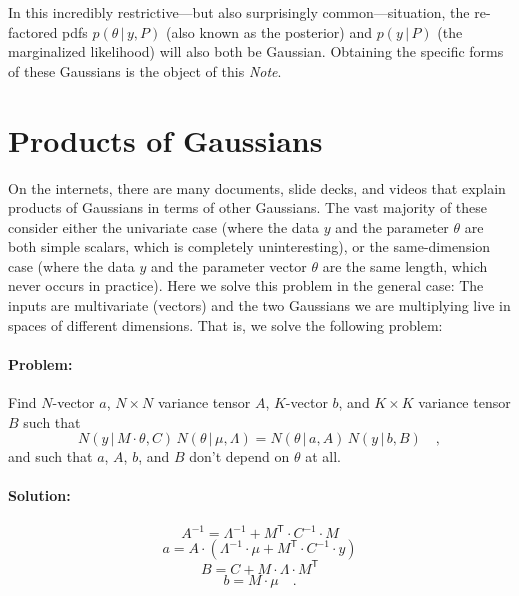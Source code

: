 \documentclass[12pt, letterpaper]{article}
\newcommand{\documentname}{\textsl{Note}}
\newcommand{\given}{\,|\,}
\newcommand{\T}{^{\!\mathsf{T}}}
\newcommand{\inv}{^{-1}}
\begin{document}
In this incredibly restrictive---but also surprisingly
common---situation, the re-factored pdfs $p(\theta\given y, P)$ (also
known as the posterior) and $p(y\given P)$ (the marginalized
likelihood) will also both be Gaussian.
Obtaining the specific forms of these Gaussians is the object of this
\documentname.

\section{Products of Gaussians}

On the internets, there are many documents, slide decks, and videos
that explain products of Gaussians in terms of other Gaussians.
The vast majority of these consider either the univariate case (where
the data $y$ and the parameter $\theta$ are both simple scalars, which
is completely uninteresting), or the same-dimension case (where the data
$y$ and the parameter vector $\theta$ are the same length, which never
occurs in practice).
Here we solve this problem in the general case:
The inputs are multivariate (vectors) and the two Gaussians we are
multiplying live in spaces of different dimensions.
That is, we solve the following problem:

\paragraph{Problem:}
Find $N$-vector $a$, $N\times N$ variance tensor $A$, $K$-vector $b$,
and $K\times K$ variance tensor $B$ such that
\begin{equation}
N(y\given M\cdot\theta, C)\,N(\theta\given\mu, \Lambda)
 = N(\theta\given a, A)\,N(y\given b, B) \quad ,
\end{equation}
and such that $a$, $A$, $b$, and $B$ don't depend on $\theta$ at all.

\paragraph{Solution:}
\begin{equation}
A\inv = \Lambda\inv + M\T \cdot C\inv \cdot M
\end{equation}
\begin{equation}
a = A \cdot (\Lambda\inv \cdot \mu + M\T \cdot C\inv \cdot y)
\end{equation}
\begin{equation}
B = C + M \cdot \Lambda \cdot M\T
\end{equation}
\begin{equation}
b = M \cdot \mu
\quad .
\end{equation}
\end{document}

